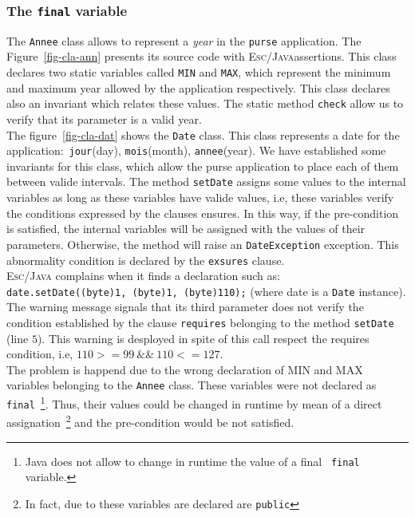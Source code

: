 \subsubsection{The {\tt \bf final} variable}
The \texttt{Annee} class allows to represent a \textit{year} in the
\texttt{purse} application. The Figure~\ref{fig-cla-ann} presents its
source code with \textsc{Esc/Java}assertions. This class declares two 
static variables called \texttt{MIN} and \texttt{MAX}, which represent
the minimum and maximum year allowed by the application
respectively. This class declares
also an invariant which relates these values. The static method
\texttt{check} allow us to verify that its parameter is a valid
year. \\

The figure~\ref{fig-cla-dat} shows the \texttt{Date} class. This class
represents a date for the application$:$ \texttt{jour}(day),
\texttt{mois}(month), \texttt{annee}(year). We have established some
invariants for this class, which allow the purse application to place
each of them between valide intervals. The method \texttt{setDate}
assigns some values to the internal variables as long as
these variables have valide values, i.e, these variables verify the
conditions expressed by the clauses ensures. In this way, if the
pre-condition is satisfied, the internal variables will be assigned
with the values of their parameters. Otherwise, the method will raise
an \texttt{DateException} exception. This abnormality condition is
declared by the \texttt{exsures} clause. \\

\textsc{Esc/Java} complains when it finds a declaration such as$:$ \\
\mbox{\tt date.setDate((byte)1, (byte)1, (byte)110);} (where date is a
\texttt{Date} instance). The warning message signals that its third
parameter does not verify the condition established by the clause
\texttt{requires} belonging to the method \texttt{setDate} (line
$5$). This warning is desployed in spite of this call respect the
requires condition, i.e, $110>=99\ \&\&\ 110<= 127$. \\

The problem is happend due to the wrong declaration of \textsc{MIN}
and \textsc{MAX} variables belonging to the \texttt{Annee}
class. These variables were not declared as \texttt{final}~\footnote{{\sc
Java} does not allow to change in runtime the value of a final {\tt
final} variable.}. Thus, their values could be changed in runtime by
mean of a direct assignation~\footnote{In fact, due to these variables
are declared are \texttt{public}} and the pre-condition would be not
satisfied. \\


